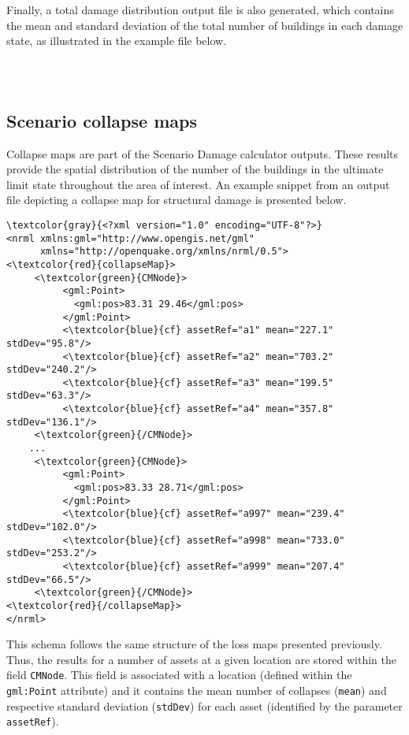 Finally, a total damage distribution output file is also generated, which contains
the mean and standard deviation of the total number of buildings in each
damage state, as illustrated in the example file below.

\inputminted[firstline=1,firstnumber=1,fontsize=\footnotesize,frame=single,linenos,bgcolor=lightgray]{xml}{oqum/risk/verbatim/output_scenario_damage_total.xml}\\


\subsection{Scenario collapse maps}

Collapse maps are part of the Scenario Damage calculator outputs. These
results provide the spatial distribution of the number of the buildings in the
ultimate limit state throughout the area of interest. An example snippet from
an output file depicting a collapse map for structural damage is presented
below.

\begin{Verbatim}[frame=single, commandchars=\\\{\}, samepage=false]
\textcolor{gray}{<?xml version="1.0" encoding="UTF-8"?>}
<nrml xmlns:gml="http://www.opengis.net/gml"
      xmlns="http://openquake.org/xmlns/nrml/0.5">
<\textcolor{red}{collapseMap}>
     <\textcolor{green}{CMNode}>
          <gml:Point>
            <gml:pos>83.31 29.46</gml:pos>
          </gml:Point>
          <\textcolor{blue}{cf} assetRef="a1" mean="227.1" stdDev="95.8"/>
          <\textcolor{blue}{cf} assetRef="a2" mean="703.2" stdDev="240.2"/>
          <\textcolor{blue}{cf} assetRef="a3" mean="199.5" stdDev="63.3"/>
          <\textcolor{blue}{cf} assetRef="a4" mean="357.8" stdDev="136.1"/>
     <\textcolor{green}{/CMNode}>
    ...
     <\textcolor{green}{CMNode}>
          <gml:Point>
            <gml:pos>83.33 28.71</gml:pos>
          </gml:Point>
          <\textcolor{blue}{cf} assetRef="a997" mean="239.4" stdDev="102.0"/>
          <\textcolor{blue}{cf} assetRef="a998" mean="733.0" stdDev="253.2"/>
          <\textcolor{blue}{cf} assetRef="a999" mean="207.4" stdDev="66.5"/>
     <\textcolor{green}{/CMNode}>
<\textcolor{red}{/collapseMap}>
</nrml>
\end{Verbatim}

This schema follows the same structure of the loss maps presented previously.
Thus, the results for a number of \glspl{asset} at a given location are stored
within the field \Verb+CMNode+. This field is associated with a location
(defined within the \Verb+gml:Point+ attribute) and it contains the mean
number of collapses (\Verb+mean+) and respective standard deviation
(\Verb+stdDev+) for each \gls{asset} (identified by the parameter
\Verb+assetRef+).